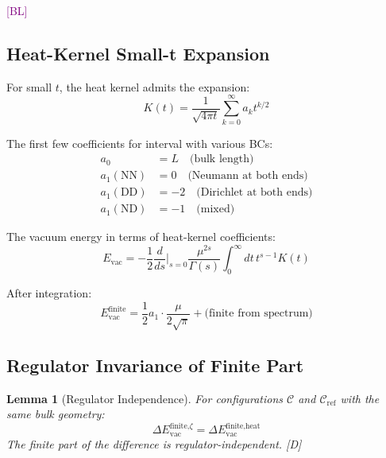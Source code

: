 \documentclass[11pt,a4paper]{article}
\newtheorem{lemma}[theorem]{Lemma}
\newcommand{\tagD}{\textcolor{blue!70!black}{[D]}}
\newcommand{\tagBL}{\textcolor{purple}{[BL]}}
\begin{document}
\tagBL

\subsection{Heat-Kernel Small-t Expansion}

For small $t$, the heat kernel admits the expansion:
\begin{equation}
\label{eq:heat-small-t}
K(t) = \frac{1}{\sqrt{4\pi t}} \sum_{k=0}^\infty a_k t^{k/2}
\end{equation}

The first few coefficients for interval with various BCs:
\begin{align}
\label{eq:heat-a0-formula}
a_0 &= L \quad \text{(bulk length)} \\
\label{eq:heat-a1-NN}
a_1(\text{NN}) &= 0 \quad \text{(Neumann at both ends)} \\
\label{eq:heat-a1-DD}
a_1(\text{DD}) &= -2 \quad \text{(Dirichlet at both ends)} \\
\label{eq:heat-a1-ND}
a_1(\text{ND}) &= -1 \quad \text{(mixed)}
\end{align}

The vacuum energy in terms of heat-kernel coefficients:
\begin{equation}
\label{eq:vac-from-heat}
E_{\text{vac}} = -\frac{1}{2} \frac{d}{ds}\bigg|_{s=0} \frac{\mu^{2s}}{\Gamma(s)}
\int_0^\infty dt\, t^{s-1} K(t)
\end{equation}

After integration:
\begin{equation}
\label{eq:vac-heat-result}
E_{\text{vac}}^{\text{finite}} = \frac{1}{2} a_1 \cdot \frac{\mu}{2\sqrt{\pi}} + \text{(finite from spectrum)}
\end{equation}

\subsection{Regulator Invariance of Finite Part}

\begin{lemma}[Regulator Independence]
\label{lem:reg-inv}
For configurations $\mathcal{C}$ and $\mathcal{C}_{\text{ref}}$ with the same bulk geometry:
\begin{equation}
\label{eq:reg-inv}
\Delta E_{\text{vac}}^{\text{finite,}\zeta} = \Delta E_{\text{vac}}^{\text{finite,heat}}
\end{equation}
The finite part of the difference is regulator-independent. \tagD
\end{lemma}
\end{document}
